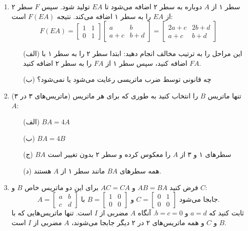 \documentclass[12pt, a4paper]{book}
\begin{document}
\begin{enumerate}
		\item سطر ۱ از $A$ دوباره به سطر ۲ اضافه می‌شود تا $EA$ تولید شود. سپس $F$ سطر ۲ از $EA$ را به سطر ۱ اضافه می‌کند. نتیجه $F(EA)$ است:
		\[ F(EA) = \begin{bmatrix} 1 & 1 \\ 0 & 1 \end{bmatrix} \begin{bmatrix} a & b \\ a+c & b+d \end{bmatrix} = \begin{bmatrix} 2a+c & 2b+d \\ a+c & b+d \end{bmatrix} \]
		\begin{itemize}
			\item[(الف)] این مراحل را به ترتیب مخالف انجام دهید: ابتدا سطر ۲ را به سطر ۱ با $FA$ اضافه کنید، سپس سطر ۱ از $FA$ را به سطر ۲ اضافه کنید.
			\item[(ب)] چه قانونی توسط ضرب ماتریسی رعایت می‌شود یا نمی‌شود؟
		\end{itemize}
		
		\item (ماتریس‌های ۳ در ۳) تنها ماتریس $B$ را انتخاب کنید به طوری که برای هر ماتریس $A$:
		\begin{itemize}
			\item[(الف)] $BA = 4A$
			\item[(ب)] $BA = 4B$
			\item[(ج)] $BA$ سطرهای ۱ و ۳ از $A$ را معکوس کرده و سطر ۲ بدون تغییر است
			\item[(د)] همه سطرهای $BA$ مانند سطر ۱ از $A$ هستند.
		\end{itemize}
		
		\item فرض کنید $AB=BA$ و $AC=CA$ برای این دو ماتریس خاص $B$ و $C$:
		\[ A = \begin{bmatrix} a & b \\ c & d \end{bmatrix} \text{ با } B = \begin{bmatrix} 1 & 0 \\ 0 & 0 \end{bmatrix} \text{ و } C = \begin{bmatrix} 0 & 1 \\ 0 & 0 \end{bmatrix} \text{ جابجا می‌شود.} \]
		ثابت کنید که $a=d$ و $b=c=0$. آنگاه $A$ مضربی از $I$ است. تنها ماتریس‌هایی که با $B$ و $C$ و همه ماتریس‌های ۲ در ۲ دیگر جابجا می‌شوند، $A$ مضربی از $I$ است.
		

\end{enumerate}
\end{document}

